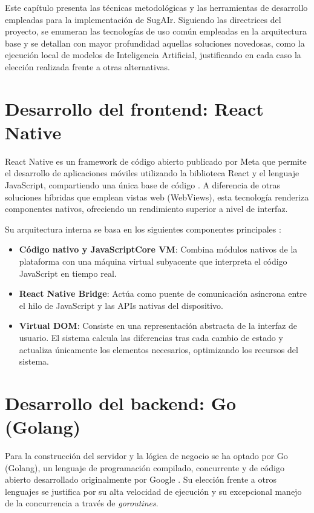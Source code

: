 
Este capítulo presenta las técnicas metodológicas y las herramientas de desarrollo empleadas para la implementación de SugAIr. Siguiendo las directrices del proyecto, se enumeran las tecnologías de uso común empleadas en la arquitectura base y se detallan con mayor profundidad aquellas soluciones novedosas, como la ejecución local de modelos de Inteligencia Artificial, justificando en cada caso la elección realizada frente a otras alternativas.

\section{Desarrollo del frontend: React Native}
React Native es un framework de código abierto publicado por Meta que permite el desarrollo de aplicaciones móviles utilizando la biblioteca React y el lenguaje JavaScript, compartiendo una única base de código \cite{react_native_dev}. A diferencia de otras soluciones híbridas que emplean vistas web (WebViews), esta tecnología renderiza componentes nativos, ofreciendo un rendimiento superior a nivel de interfaz.

Su arquitectura interna se basa en los siguientes componentes principales \cite{react_native_dev}:
\begin{itemize}
    \item \textbf{Código nativo y JavaScriptCore VM}: Combina módulos nativos de la plataforma con una máquina virtual subyacente que interpreta el código JavaScript en tiempo real.
    \item \textbf{React Native Bridge}: Actúa como puente de comunicación asíncrona entre el hilo de JavaScript y las APIs nativas del dispositivo.
    \item \textbf{Virtual DOM}: Consiste en una representación abstracta de la interfaz de usuario. El sistema calcula las diferencias tras cada cambio de estado y actualiza únicamente los elementos necesarios, optimizando los recursos del sistema.
\end{itemize}

\section{Desarrollo del backend: Go (Golang)}
Para la construcción del servidor y la lógica de negocio se ha optado por Go (Golang), un lenguaje de programación compilado, concurrente y de código abierto desarrollado originalmente por Google \cite{donovan_go}. Su elección frente a otros lenguajes se justifica por su alta velocidad de ejecución y su excepcional manejo de la concurrencia a través de \textit{goroutines}.

